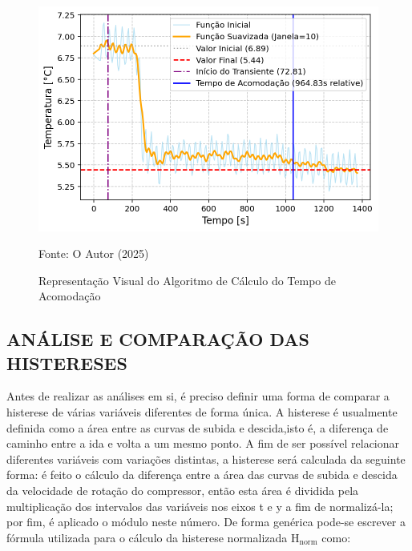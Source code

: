 \begin{figure}[h]
    \centering
    \includegraphics[width=1\linewidth]{FigurasdoTexto/Exemplo tempo de acomodação.png}
    \caption{Representação Visual do Algoritmo de Cálculo do Tempo de Acomodação}
    \label{fig:exemplo de cálculo do tempo de acomodação}
    {\footnotesize Fonte: O Autor (2025)}
\end{figure}
\subsection{\MakeUppercase{Análise e Comparação das Histereses}} \label{subsec:Método de Análise da Histerese}

Antes de realizar as análises em si, é preciso definir uma forma de comparar a histerese de várias variáveis diferentes de forma única. A histerese é usualmente definida como a área entre as curvas de subida e descida,isto é, a diferença de caminho entre a ida e volta a um mesmo ponto. A fim de ser possível relacionar diferentes variáveis com variações distintas, a histerese será calculada da seguinte forma: é feito o cálculo da diferença entre a área das curvas de subida e descida da velocidade de rotação do compressor, então esta área é dividida pela multiplicação dos intervalos das variáveis nos eixos t e y a fim de normalizá-la; por fim, é aplicado o módulo neste número. De forma genérica pode-se escrever a fórmula utilizada para o cálculo da histerese normalizada $\text{H}_\text{norm}$ como:

